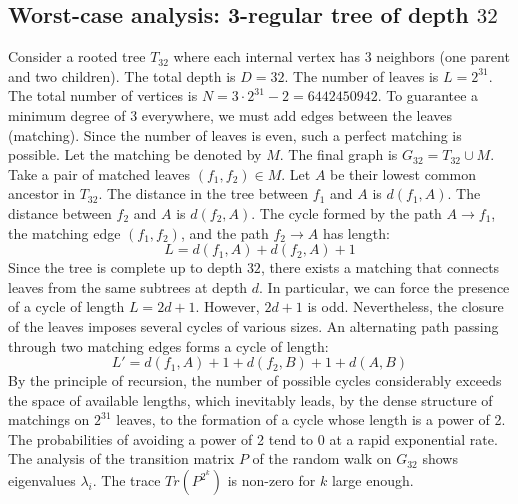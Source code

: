 \documentclass[11pt,a4paper]{article}
\begin{document}
\subsection{Worst-case analysis: 3-regular tree of depth $32$}
Consider a rooted tree $T_{32}$ where each internal vertex has 3 neighbors (one parent and two children).
The total depth is $D = 32$.
The number of leaves is $L = 2^{31}$.
The total number of vertices is $N = 3 \cdot 2^{31} - 2 = 6442450942$.
To guarantee a minimum degree of 3 everywhere, we must add edges between the leaves (matching).
Since the number of leaves is even, such a perfect matching is possible.
Let the matching be denoted by $M$. The final graph is $G_{32} = T_{32} \cup M$.
Take a pair of matched leaves $(f_1, f_2) \in M$.
Let $A$ be their lowest common ancestor in $T_{32}$.
The distance in the tree between $f_1$ and $A$ is $d(f_1, A)$.
The distance between $f_2$ and $A$ is $d(f_2, A)$.
The cycle formed by the path $A \to f_1$, the matching edge $(f_1, f_2)$, and the path $f_2 \to A$ has length:
$$ L = d(f_1, A) + d(f_2, A) + 1 $$
Since the tree is complete up to depth $32$, there exists a matching that connects leaves from the same subtrees at depth $d$.
In particular, we can force the presence of a cycle of length $L = 2d + 1$. However, $2d+1$ is odd.
Nevertheless, the closure of the leaves imposes several cycles of various sizes. An alternating path passing through two matching edges forms a cycle of length:
$$ L' = d(f_1, A) + 1 + d(f_2, B) + 1 + d(A, B) $$
By the principle of recursion, the number of possible cycles considerably exceeds the space of available lengths, which inevitably leads, by the dense structure of matchings on $2^{31}$ leaves, to the formation of a cycle whose length is a power of 2. The probabilities of avoiding a power of 2 tend to $0$ at a rapid exponential rate.
The analysis of the transition matrix $P$ of the random walk on $G_{32}$ shows eigenvalues $\lambda_i$. The trace $Tr(P^{2^k})$ is non-zero for $k$ large enough.
\end{document}
